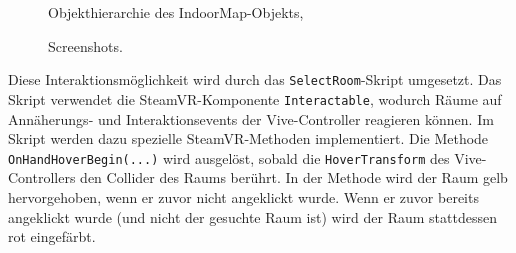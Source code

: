 \begin{figure}[tbh]
    \begin{minipage}[t]{0.35\textwidth}
        \centering
        \vspace{0pt}
        \caption{Objekthierarchie des IndoorMap-Objekts,}
        \label{fig:room_hierarchy}    
    \end{minipage}
    \hfill
    \begin{minipage}[t]{0.64\textwidth}
        \centering
        \vspace{0pt}
        \begin{subfigure}{\linewidth}
            \caption{}
        \end{subfigure}
    
        \vspace{1em}
        \begin{subfigure}{\linewidth}
            \caption{}
        \end{subfigure}
    \caption{Screenshots.}
    \end{minipage}
\end{figure}

Diese Interaktionsmöglichkeit wird durch das \lstinline|SelectRoom|-Skript umgesetzt.
Das Skript verwendet die SteamVR-Komponente \lstinline|Interactable|, wodurch Räume auf An\-nä\-he\-rungs- und Interaktionsevents der Vive-Controller reagieren können.
Im Skript werden dazu spezielle SteamVR-Methoden implementiert.
Die Methode \lstinline|OnHandHoverBegin(...)| wird ausgelöst, sobald die \lstinline|HoverTransform| des Vive-Controllers den Collider des Raums berührt.
In der Methode wird der Raum gelb hervorgehoben, wenn er zuvor nicht angeklickt wurde.
Wenn er zuvor bereits angeklickt wurde (und nicht der gesuchte Raum ist) wird der Raum stattdessen rot eingefärbt.

